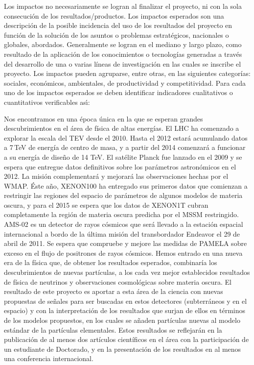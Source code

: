 \begin{instrucciones}
  Los impactos no necesariamente se logran al finalizar el proyecto, ni
con la sola consecución de los resultados/productos. Los impactos
esperados son una descripción de la posible incidencia del uso de los
resultados del proyecto en función de la solución de los asuntos o
problemas estratégicos, nacionales o globales, abordados. Generalmente
se logran en el mediano y largo plazo, como resultado de la aplicación
de los conocimientos o tecnologías generadas a través del desarrollo
de una o varias líneas de investigación en las cuales se inscribe el
proyecto. Los impactos pueden agruparse, entre otras, en las
siguientes categorías: sociales, económicos, ambientales, de
productividad y competitividad. Para cada uno de los impactos
esperados se deben identificar indicadores cualitativos o
cuantitativos verificables as\'\i:
\end{instrucciones}


Nos encontramos en una época única en la que se esperan grandes
descubrimientos en el área de física de altas energías. El LHC ha
comenzado a explorar la escala del TEV desde el 2010. Hasta el 2012
estará acumulando datos a 7\,TeV de energía de centro de masa, y a
partir del 2014 comenzará a funcionar a su energía de diseño de 14
TeV. El satélite Planck fue lanzado en el 2009 y se espera que
entregue datos definitivos sobre los parámetros astronómicos en el
2012. La misión complementará y mejorará las observaciones hechas por
el WMAP. Éste año, XENON100 ha entregado sus primeros datos que
comienzan a restringir las regiones del espacio de parámetros de
algunos modelos de materia oscura, y para el 2015 se espera que los
datos de XENON1T cubran completamente la región de materia oscura
predicha por el MSSM restringido. AMS-02 es un detector de rayos
cósmicos que será llevado a la estación espacial internacional a bordo
de la última misión del transbordador Endeavor el 29 de abril de
2011. Se espera que compruebe y mejore las medidas de PAMELA sobre
exceso en el flujo de positrones de rayos cósmicos. Hemos entrado en
una nueva era de la física que, de obtener los resultados esperados,
combinaría los descubrimientos de nuevas partículas, a los cada vez
mejor establecidos resultados de física de neutrinos y observaciones
cosmológicas sobre materia oscura. El resultado de este proyecto es
aportar a esta área de la ciencia con nuevas propuestas de señales
para ser buscadas en estos detectores (subterráneos y en el espacio) y
con la interpretación de los resultados que surjan de ellos en
términos de los modelos propuestos, en los cuales se añaden partículas
nuevas al modelo estándar de la partículas elementales. Estos
resultados se reflejarán en la publicación de al menos dos artículos
científicos en el área con la participación de un estudiante de
Doctorado, y en la presentación de los resultados en al menos una
conferencia internacional.


